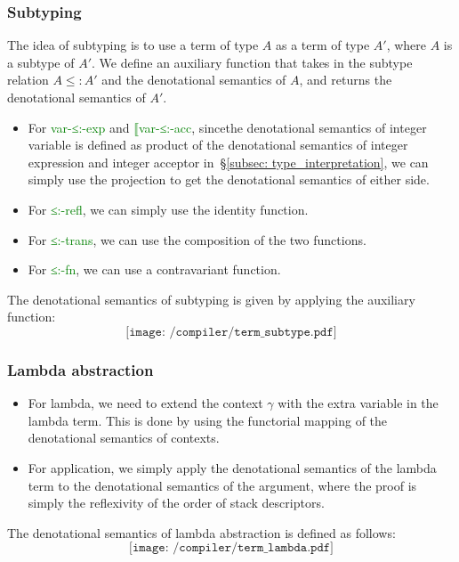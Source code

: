 \documentclass[12pt,a4paper]{report}
\theoremstyle{definition}
\newcommand{\secref}[1]{\S\ref{#1}}
\newcommand{\gn}[1]{\textcolor{green}{#1}}
\newcommand{\gnt}[1]{\gn{\textsf{#1}}}
\begin{document}
        \subsubsection{Subtyping}
        The idea of subtyping is to use a term of type $A$ as a term of type $A'$, where $A$ is a subtype of $A'$. We define an auxiliary function that takes in the subtype relation $A\leq:A'$ and the denotational semantics of $A$, and returns the denotational semantics of $A'$. 
        \begin{itemize}
            \item For \gnt{var-≤:-exp} and \gnt{⟦var-≤:-acc}, sincethe denotational semantics of integer variable is defined as product of the denotational semantics of integer expression and integer acceptor in~\secref{subsec: type_interpretation}, we can simply use the projection to get the denotational semantics of either side.
            \item For \gnt{≤:-refl}, we can simply use the identity function.
            \item For \gnt{≤:-trans}, we can use the composition of the two functions.
            \item For \gnt{≤:-fn}, we can use a contravariant function.
        \end{itemize}
        The denotational semantics of subtyping is given by applying the auxiliary function:
        \[\texttt{[image: /compiler/term\_subtype.pdf]}\]

        \subsubsection{Lambda abstraction}
        \begin{itemize}
            \item For lambda, we need to extend the context $\gamma$ with the extra variable in the lambda term. This is done by using the functorial mapping of the denotational semantics of contexts.
            \item For application, we simply apply the denotational semantics of the lambda term to the denotational semantics of the argument, where the proof is simply the reflexivity of the order of stack descriptors.
        \end{itemize}
        The denotational semantics of lambda abstraction is defined as follows:
        \[\texttt{[image: /compiler/term\_lambda.pdf]}\]
\end{document}
